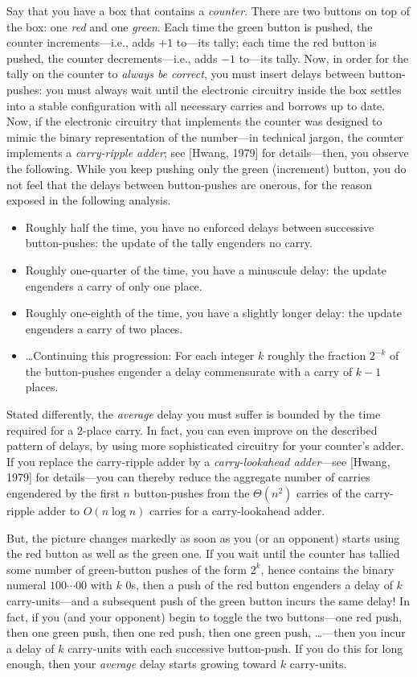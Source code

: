 \noindent
Say that you have a box that contains a {\it counter}.  There are two buttons on top of the box: one {\em red} and one {\em green}.  Each time the green button is pushed, the counter increments---i.e., adds $+1$ to---its tally; each time the red button is pushed, the counter
decrements---i.e., adds $-1$ to---its tally.  Now, in order for the tally on the counter to {\em always be correct}, you must insert delays between button-pushes: you must always wait until the
electronic circuitry inside the box settles into a stable configuration with all necessary carries and borrows up to date.  Now, if the electronic circuitry that implements the counter was designed to mimic the binary representation of the number---in technical jargon,  the counter implements a {\it carry-ripple adder}; see [Hwang, 1979] for details---then, you observe the following.  While you keep pushing only the green (increment) button, you do not feel that the delays between
button-pushes are onerous, for the reason exposed in the following analysis.
\begin{itemize}
\item
Roughly half the time, you have no enforced delays between successive button-pushes: the update of the tally engenders no carry.
\item
Roughly one-quarter of the time, you have a minuscule delay: the update engenders a carry of only one place.
\item
Roughly one-eighth of the time, you have a slightly longer delay: the update engenders a carry of two places.
\item
\ldots Continuing this progression: For each integer $k$ roughly the fraction $2^{-k}$ of the button-pushes engender a delay commensurate with a carry of $k-1$ places.
\end{itemize}
Stated differently, the {\em average} delay you must suffer is bounded by the time required for a $2$-place carry.  In fact, you can even improve on the described pattern of delays, by using more
sophisticated circuitry for your counter's adder.  If you replace the carry-ripple adder by a {\it carry-lookahead adder}---see [Hwang, 1979] for details---you can thereby reduce the aggregate
number of carries engendered by the first $n$ button-pushes from the $\Theta(n^2)$ carries of the carry-ripple adder to $O(n \log n)$ carries for a carry-lookahead adder.

\smallskip

But, the picture changes markedly as soon as you (or an opponent) starts using the red button as well as the green one.  If you wait until the counter has tallied some number of green-button pushes of the form $2^k$, hence contains the binary numeral $100 \cdots 00$ with $k$ $0$s, then a push of the red button engenders a delay of $k$ carry-units---and a subsequent push of the green button incurs the same delay!  In fact, if you (and your opponent) begin to toggle the
two buttons---one red push, then one green push, then one red push, then one green push, \ldots---then you incur a delay of $k$ carry-units with each successive button-push.  If you do this for long enough, then your {\em average} delay starts growing toward $k$ carry-units.

